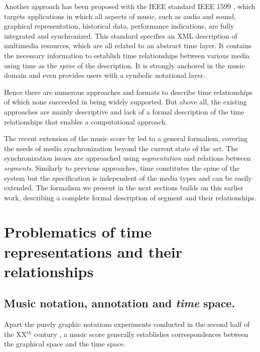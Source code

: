 \documentclass[letterpaper, 12pt]{article}
\begin{document}
Another approach has been proposed with the IEEE standard IEEE 1599 \cite{baggi09b}, which targets applications in which all aspects of music, such as audio and sound, graphical representation, historical data, performance indications, are fully integrated and synchronized. This standard specifies an XML description of multimedia resources, which are all related to an abstract time layer. It contains the necessary information to establish time relationships between various media using time as the \emph{spine} of the description. It is strongly anchored in the music domain and even provides users with a symbolic notational layer. 

Hence there are numerous approaches and formats to describe time relationships of which none succeeded in being widely supported. But above all, the existing approaches are mainly descriptive and lack of a formal description of the time relationships that enables a computational approach.

The recent extension of the music score by \cite{Fober:10c} led to a general formalism, covering the needs of media synchronization beyond the current state of the art. The synchronization issues are approached using  \emph{segmentation} and  relations between \emph{segments}. Similarly to previous approaches, time constitutes the spine of the system but the specification is independent of the media types and can be easily extended. The formalism we present in the next sections builds on this earlier work, describing a complete formal description of segment and their relationships.


\section{Problematics of time representations and their relationships}

\subsection{Music notation, annotation and \emph{time} space.}
Apart the purely graphic notations experiments conducted in the second half of the XX$^{th}$ century \cite{quist1984indeterminate,schnebel1969mo}, a music score generally establishes correspondences between the graphical space and the time space. 
\end{document}
